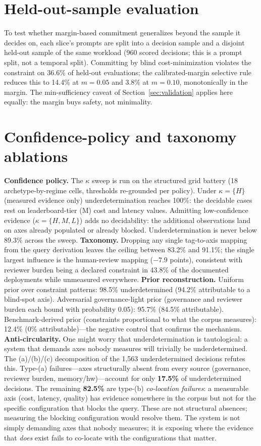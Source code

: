 \documentclass{article} %
\begin{document}
\section{Held-out-sample evaluation}
\label{app:prospective}
To test whether margin-based commitment generalizes beyond the sample it decides on, each slice's prompts are split into a decision sample and a disjoint held-out sample of the same workload (960 scored decisions; this is a prompt split, not a temporal split). Committing by blind cost-minimization violates the constraint on 36.6\% of held-out evaluations; the calibrated-margin selective rule reduces this to 14.4\% at $m{=}0.05$ and 3.8\% at $m{=}0.10$, monotonically in the margin. The min-sufficiency caveat of Section~\ref{sec:validation} applies here equally: the margin buys safety, not minimality.

\section{Confidence-policy and taxonomy ablations}
\label{app:ablations}
\textbf{Confidence policy.} The $\kappa$ sweep is run on the structured grid battery (18 archetype-by-regime cells, thresholds re-grounded per policy). Under $\kappa = \{H\}$ (measured evidence only) underdetermination reaches 100\%: the decidable cases rest on leaderboard-tier (M) cost and latency values. Admitting low-confidence evidence ($\kappa = \{H,M,L\}$) adds no decidability: the additional observations land on axes already populated or already blocked. Underdetermination is never below 89.3\% across the sweep.
\textbf{Taxonomy.} Dropping any single tag-to-axis mapping from the query derivation leaves the ceiling between 83.2\% and 91.1\%; the single largest influence is the human-review mapping ($-7.9$ points), consistent with reviewer burden being a declared constraint in 43.8\% of the documented deployments while unmeasured everywhere.
\textbf{Prior reconstruction.} Uniform prior over constraint patterns: 98.5\% underdetermined (94.2\% attributable to a blind-spot axis). Adversarial governance-light prior (governance and reviewer burden each bound with probability 0.05): 95.7\% (84.5\% attributable). Benchmark-derived prior (constraints proportional to what the corpus measures): 12.4\% (0\% attributable)---the negative control that confirms the mechanism. \textbf{Anti-circularity.} One might worry that underdetermination is tautological: a system that demands axes nobody measures will trivially be underdetermined. The (a)/(b)/(c) decomposition of the 1{,}563 underdetermined decisions refutes this. Type-(a) failures---axes structurally absent from every source (governance, reviewer burden, memory/hw)---account for only \textbf{17.5\%} of underdetermined decisions. The remaining \textbf{82.5\%} are type-(b) \emph{co-location failures}: a measurable axis (cost, latency, quality) has evidence somewhere in the corpus but not for the specific configuration that blocks the query. These are not structural absences; measuring the blocking configuration would resolve them. The system is not simply demanding axes that nobody measures; it is exposing where the evidence that \emph{does} exist fails to co-locate with the configurations that matter.
\end{document}
